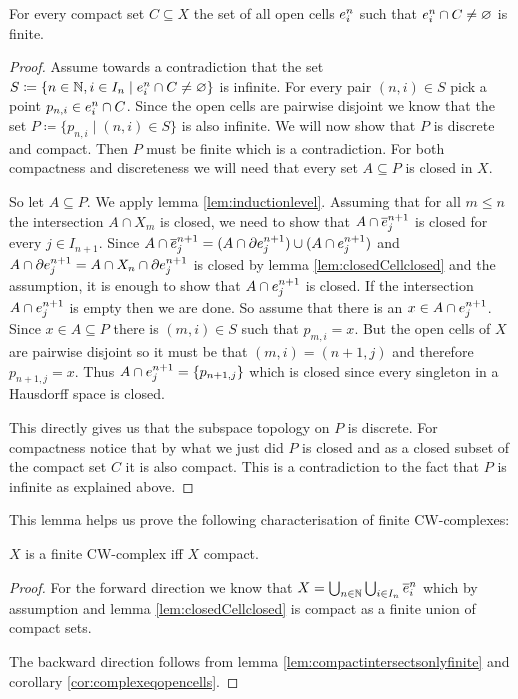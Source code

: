 \begin{lem} \label{lem:compactintersectsonlyfinite}
    For every compact set $C \subseteq X$ the set of all open cells $\openCell{n}{i}$ such that $\openCell{n}{i} \cap C \ne \varnothing$ is finite.
\end{lem}
\begin{proof}
    Assume towards a contradiction that the set $S \coloneq \{n \in \bN, i \in I_n \mid \openCell{n}{i} \cap C \ne \varnothing \}$ is infinite. 
    For every pair $(n, i) \in S$ pick a point $p_{n, i} \in \openCell{n}{i} \cap C$. 
    Since the open cells are pairwise disjoint we know that the set $P \coloneq \{p_{n, i} \mid (n, i) \in S\}$ is also infinite.
    We will now show that $P$ is discrete and compact. 
    Then $P$ must be finite which is a contradiction.
    For both compactness and discreteness we will need that every set $A \subseteq P$ is closed in $X$.

    So let $A \subseteq P$. 
    We apply lemma \ref{lem:inductionlevel}. 
    Assuming that for all $m \le n$ the intersection $A \cap X_m$ is closed, we need to show that $A \cap \closedCell{n + 1}{j}$ is closed for every $j \in I_{n + 1}$.
    Since $A \cap \closedCell{n + 1}{j} = (A \cap \cellFrontier{n + 1}{j}) \cup (A \cap \openCell{n + 1}{j})$ and $A \cap \cellFrontier{n + 1}{j} = A \cap X_{n} \cap \cellFrontier{n + 1}{j}$ is closed by lemma \ref{lem:closedCellclosed} and the assumption, it is enough to show that $A \cap \openCell{n + 1}{j}$ is closed. 
    If the intersection $A \cap \openCell{n + 1}{j}$ is empty then we are done. 
    So assume that there is an $x \in A \cap \openCell{n + 1}{j}$. 
    Since $x \in A \subseteq P$ there is $(m, i) \in S$ such that $p_{m, i} = x$. 
    But the open cells of $X$ are pairwise disjoint so it must be that $(m, i) = (n + 1, j)$ and therefore $p_{n + 1, j} = x$. 
    Thus $A \cap \openCell{n + 1}{j} = \{p_{n + 1, j}\}$ which is closed since every singleton in a Hausdorff space is closed. 

    This directly gives us that the subspace topology on $P$ is discrete. 
    For compactness notice that by what we just did $P$ is closed and as a closed subset of the compact set $C$ it is also compact. 
    This is a contradiction to the fact that $P$ is infinite as explained above. 
\end{proof}

This lemma helps us prove the following characterisation of finite CW-complexes: 

\begin{lem}
    $X$ is a finite CW-complex iff $X$ compact.
\end{lem}
\begin{proof}
    For the forward direction we know that $X = \bigcup_{n \in \bN}\bigcup_{i \in I_n} \closedCell{n}{i}$ which by assumption and lemma \ref{lem:closedCellclosed} is compact as a finite union of compact sets. 

    The backward direction follows from lemma \ref{lem:compactintersectsonlyfinite} and corollary \ref{cor:complexeqopencells}.
\end{proof}
